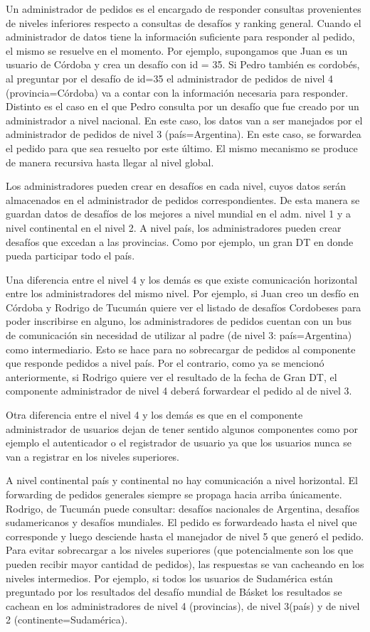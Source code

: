 Un administrador de pedidos es el encargado de responder consultas provenientes de niveles inferiores respecto a consultas de desafíos y ranking general. Cuando el administrador de datos tiene la información suficiente para responder al pedido, el
mismo se resuelve en el momento. Por ejemplo, supongamos que Juan es un usuario de Córdoba y crea un desafío con id = 35.
Si Pedro también es cordobés, al preguntar por el desafío de id=35 el administrador de pedidos de nivel 4 (provincia=Córdoba) va a contar con la información necesaria para responder.
Distinto es el caso en el que Pedro consulta por un desafío que fue creado por un administrador a nivel nacional. En este caso, los datos van a ser manejados por el administrador de pedidos de nivel 3 (país=Argentina). En este caso, se forwardea el
pedido para que sea resuelto por este último.
El mismo mecanismo se produce de manera recursiva hasta llegar al nivel global.

Los administradores pueden crear en desafíos en cada nivel, cuyos datos serán almacenados en el administrador de pedidos
correspondientes. De esta manera se guardan datos de desafíos de los mejores a nivel mundial en el adm. nivel 1 y a nivel continental en el nivel 2. A nivel país, los administradores pueden crear desafíos que excedan a las provincias. Como por ejemplo, un gran DT en donde pueda participar todo el país.

Una diferencia entre el nivel 4 y los demás es que existe comunicación horizontal entre los administradores del mismo nivel. Por ejemplo, si Juan creo un desfío en Córdoba y Rodrigo de Tucumán quiere ver el listado de desafíos Cordobeses para poder inscribirse en alguno, los administradores de pedidos cuentan con un bus de comunicación sin necesidad de utilizar
al padre (de nivel 3: país=Argentina) como intermediario. Esto se hace para no sobrecargar de pedidos al componente
que responde pedidos a nivel país. Por el contrario, como ya se mencionó anteriormente, si Rodrigo quiere ver el resultado de la fecha de Gran DT, el componente administrador de nivel 4 deberá forwardear el pedido al de nivel 3.

Otra diferencia entre el nivel 4 y los demás es que en el componente administrador de usuarios dejan de tener sentido algunos componentes como por ejemplo el autenticador o el registrador de usuario ya que los usuarios nunca se van a registrar en los niveles superiores.

A nivel continental país y continental no hay comunicación a nivel horizontal. El forwarding de pedidos generales siempre se propaga hacia arriba únicamente. Rodrigo, de Tucumán puede consultar: desafíos nacionales de Argentina, desafíos sudamericanos y desafíos mundiales. El pedido es forwardeado hasta el nivel que corresponde y luego desciende hasta el
manejador de nivel 5 que generó el pedido. Para evitar sobrecargar a los niveles superiores (que potencialmente son los que pueden recibir mayor cantidad de pedidos), las respuestas se van cacheando en los niveles intermedios. Por ejemplo,
si todos los usuarios de Sudamérica están preguntado por los resultados del desafío mundial de Básket los resultados
se cachean en los administradores de nivel 4 (provincias), de nivel 3(país) y de nivel 2 (continente=Sudamérica).


